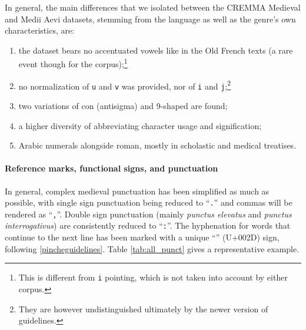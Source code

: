 \documentclass{article}
\begin{document}

In general, the main differences that we isolated between the CREMMA Medieval and Medii Aevi datasets, stemming from the language as well as the genre's own characteristics, are:
\begin{enumerate}
    \item the dataset bears no accentuated vowels like in the Old French texts (a rare event though for the corpus);\footnote{This is different from \texttt{i} pointing, which is not taken into account by either corpus.}
    \item no normalization of \texttt{u} and \texttt{v} was provided, nor of \texttt{i} and \texttt{j};\footnote{They are however undistinguished ultimately by the newer version of guidelines.}
    \item two variations of con (antisigma) and 9-shaped are found;
    \item a higher diversity of abbreviating character usage and signification;
    \item Arabic numerals alongside roman, mostly in scholastic and medical treatises.
\end{enumerate}

\paragraph{Reference marks, functional signs, and punctuation}

In general, complex medieval punctuation has been simplified as much as possible, with single sign punctuation being reduced to \enquote{\texttt{.}} and commas will be rendered as \enquote{\texttt{,}}. Double sign punctuation (mainly \textit{punctus elevatus} and \textit{punctus interrogativus}) are consistently reduced to \enquote{\texttt{:}}. The hyphenation for words that continue to the next line has been marked with a unique \enquote{} (U+002D) sign, following \ref{pincheguidelines}. Table \ref{tab:all_punct} gives a representative example.
\end{document}
